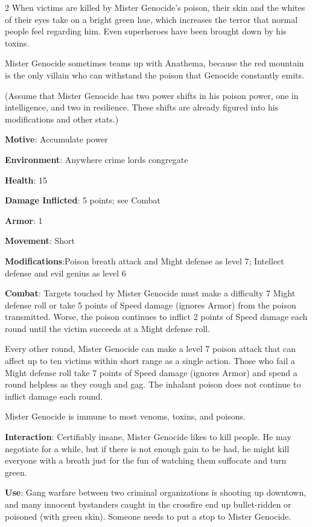 \begin{multicols}{2}
When victims are killed by Mister Genocide’s poison, their skin and the whites of their eyes take on a bright green hue, which increases the terror that normal people feel regarding him. Even superheroes have been brought down by his toxins. 

Mister Genocide sometimes teams up with Anathema, because the red mountain is the only villain who can withstand the poison that Genocide constantly emits.

(Assume that Mister Genocide has two power shifts in his poison power, one in intelligence, and two in resilience. These shifts are already figured into his modifications and other stats.)

\textbf{Motive}: Accumulate power

\textbf{Environment}: Anywhere crime lords congregate

\textbf{Health}: 15

\textbf{Damage Inflicted}: 5 points; see Combat

\textbf{Armor}: 1

\textbf{Movement}: Short

\textbf{Modifications}:Poison breath attack and Might defense as level 7; Intellect defense and evil genius as level 6

\textbf{Combat}: Targets touched by Mister Genocide must make a difficulty 7 Might defense roll or take 5 points of Speed damage (ignores Armor) from the poison transmitted. Worse, the poison continues to inflict 2 points of Speed damage each round until the victim succeeds at a Might defense roll.

Every other round, Mister Genocide can make a level 7 poison attack that can affect up to ten victims within short range as a single action. Those who fail a Might defense roll take 7 points of Speed damage (ignores Armor) and spend a round helpless as they cough and gag. The inhalant poison does not continue to inflict damage each round.

Mister Genocide is immune to most venoms, toxins, and poisons.	

\textbf{Interaction}: Certifiably insane, Mister Genocide likes to kill people. He may negotiate for a while, but if there is not enough gain to be had, he might kill everyone with a breath just for the fun of watching them suffocate and turn green.

\textbf{Use}: Gang warfare between two criminal organizations is shooting up downtown, and many innocent bystanders caught in the crossfire end up bullet-ridden or poisoned (with green skin). Someone needs to put a stop to Mister Genocide.


\end{multicols}

